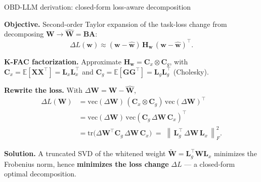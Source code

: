 \documentclass[9pt]{beamer}
\newcommand{\mat}[1]{\mathbf{#1}}
\newcommand{\norm}[1]{\left\lVert#1\right\rVert}
\begin{document}
	\begin{frame}{OBD-LLM derivation: closed-form loss-aware decomposition}

		\textbf{Objective.} Second-order Taylor expansion of the task-loss change from decomposing $\mat{W}\!\to\!\hat{\mat{W}}=\mat{B}\mat{A}$:
		\[
		\Delta L(\mat{w}) \approx (\mat{w}-\hat{\mat{w}})\,\mat{H}_{\mat{w}}\,(\mat{w}-\hat{\mat{w}})^{\!\top}. 
		\]

		\textbf{K-FAC factorization.} Approximate $\mat{H}_{\mat{w}}=\mat{C}_x\otimes\mat{C}_g$, with $\mat{C}_x=\mathbb{E}[\mat{X}\mat{X}^{\!\top}]=\mat{L}_x\mat{L}_x^{\!\top}$ and $\mat{C}_g=\mathbb{E}[\mat{G}\mat{G}^{\!\top}]=\mat{L}_g\mat{L}_g^{\!\top}$ (Cholesky).

		\textbf{Rewrite the loss.} With $\Delta\mat{W}=\mat{W}-\hat{\mat{W}}$,
		\begin{align*}
		\Delta L(\mat{W})
		&=\mathrm{vec}(\Delta\mat{W})\,(\mat{C}_x\otimes\mat{C}_g)\,\mathrm{vec}(\Delta\mat{W})^{\!\top}\\
		&=\mathrm{vec}(\Delta\mat{W})\,\mathrm{vec}(\mat{C}_g\,\Delta\mat{W}\,\mat{C}_x)^{\!\top}\\
		&=\mathrm{tr}\!\big(\Delta\mat{W}^{\!\top}\mat{C}_g\,\Delta\mat{W}\,\mat{C}_x\big)
		\;=\;\norm{\,\mat{L}_g^{\!\top}\,\Delta\mat{W}\,\mat{L}_x\,}_F^2.
		\end{align*}

		\textbf{Solution.} A truncated SVD of the whitened weight $\tilde{\mat{W}}=\mat{L}_g^{\!\top}\mat{W}\mat{L}_x$ minimizes the Frobenius norm, hence \textbf{minimizes the loss change} $\Delta L$ --- a closed-form optimal decomposition.

	\end{frame}
\end{document}
